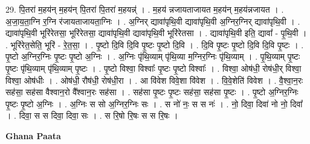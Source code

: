 \documentclass[17pt]{extarticle}
\begin{document}
29. पि॒तरा॑ म॒हय॑न् म॒हय॑न् पि॒तरा॑ पि॒तरा॑ म॒हयन्न्॑ । . म॒हय॑ न्नजायताजायत म॒हय॑न् म॒हय॑न्नजायत । . अ॒जा॒य॒ता॒ग्नि र॒ग्नि र॑जायताजायता॒ग्निः । . अ॒ग्निर् द्यावा॑पृथि॒वी द्यावा॑पृथि॒वी अ॒ग्निर॒ग्निर् द्यावा॑पृथि॒वी । . द्यावा॑पृथि॒वी भूरि॑रेतसा॒ भूरि॑रेतसा॒ द्यावा॑पृथि॒वी द्यावा॑पृथि॒वी भूरि॑रेतसा । . द्यावा॑पृथि॒वी इति॒ द्यावा᳚ - पृ॒थि॒वी । . भूरि॑रेत॒सेति॒ भूरि॑ - रे॒त॒सा॒ । . पृ॒ष्टो दि॒वि दि॒वि पृ॒ष्टः पृ॒ष्टो दि॒वि । . दि॒वि पृ॒ष्टः पृ॒ष्टो दि॒वि दि॒वि पृ॒ष्टः । . पृ॒ष्टो अ॒ग्निर॒ग्निः पृ॒ष्टः पृ॒ष्टो अ॒ग्निः । . अ॒ग्निः पृ॑थि॒व्याम् पृ॑थि॒व्या म॒ग्निर॒ग्निः पृ॑थि॒व्याम् । . पृ॒थि॒व्याम् पृ॒ष्टः पृ॒ष्टः पृ॑थि॒व्याम् पृ॑थि॒व्याम् पृ॒ष्टः । . पृ॒ष्टो विश्वा॒ विश्वाः᳚ पृ॒ष्टः पृ॒ष्टो विश्वाः᳚ । . विश्वा॒ ओष॑धी॒ रोष॑धी॒र् विश्वा॒ विश्वा॒ ओष॑धीः । . ओष॑धी॒ रौष॑धी॒ रोष॑धी॒रा । . आ वि॑वेश विवे॒शा वि॑वेश । . वि॒वे॒शेति॑ विवेश । . वै॒श्वा॒न॒रः सह॑सा॒ सह॑सा वैश्वान॒रो वै᳚श्वान॒रः सह॑सा । . सह॑सा पृ॒ष्टः पृ॒ष्टः सह॑सा॒ सह॑सा पृ॒ष्टः । . पृ॒ष्टो अ॒ग्निर॒ग्निः पृ॒ष्टः पृ॒ष्टो अ॒ग्निः । . अ॒ग्निः स सो अ॒ग्निर॒ग्निः सः । . स नो॑ नः॒ स स नः॑ । . नो॒ दिवा॒ दिवा॑ नो नो॒ दिवा᳚ । . दिवा॒ स स दिवा॒ दिवा॒ सः । . स रि॒षो रि॒षः स स रि॒षः । \newline

\textbf{Ghana Paata } \newline
\end{document}
